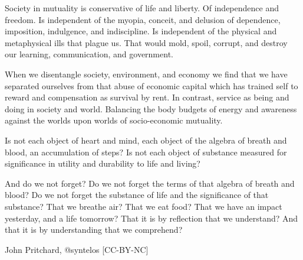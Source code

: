 Society in mutuality is conservative of life and liberty.  Of
independence and freedom.  Is independent of the myopia, conceit, and
delusion of dependence, imposition, indulgence, and indiscipline.  Is
independent of the physical and metaphysical ills that plague us.
That would mold, spoil, corrupt, and destroy our learning,
communication, and government.

When we disentangle society, environment, and economy we find that we
have separated ourselves from that abuse of economic capital which has
trained self to reward and compensation as survival by rent.  In
contrast, service as being and doing in society and world.  Balancing
the body budgets of energy and awareness against the worlds upon
worlds of socio-economic mutuality.

Is not each object of heart and mind, each object of the algebra of
breath and blood, an accumulation of steps?  Is not each object of
substance measured for significance in utility and durability to life
and living?

And do we not forget?  Do we not forget the terms of that algebra of
breath and blood?  Do we not forget the substance of life and the
significance of that substance?  That we breathe air?  That we eat
food?  That we have an impact yesterday, and a life tomorrow?  That it
is by reflection that we understand?  And that it is by understanding
that we comprehend?

{\tail John Pritchard, @syntelos [CC-BY-NC]}

\bye
